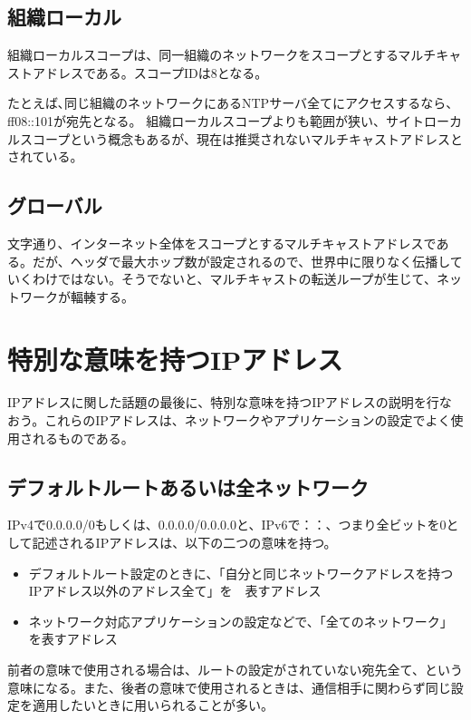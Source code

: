 \subsection{組織ローカル}
組織ローカルスコープは、同一組織のネットワークをスコープとするマルチキャストアドレスである。スコープIDは8となる。

たとえば､同じ組織のネットワークにあるNTPサーバ全てにアクセスするなら、ff08::101が宛先となる。
組織ローカルスコープよりも範囲が狭い、サイトローカルスコープという概念もあるが、現在は推奨されないマルチキャストアドレスとされている。

\subsection{グローバル}
文字通り、インターネット全体をスコープとするマルチキャストアドレスである。だが、ヘッダで最大ホップ数が設定されるので、世界中に限りなく伝播していくわけではない。そうでないと、マルチキャストの転送ループが生じて、ネットワークが輻輳する。


\section{特別な意味を持つIPアドレス}

IPアドレスに関した話題の最後に、特別な意味を持つIPアドレスの説明を行なおう。これらのIPアドレスは、ネットワークやアプリケーションの設定でよく使用されるものである。

\subsection{デフォルトルートあるいは全ネットワーク}

IPv4で0.0.0.0/0もしくは、0.0.0.0/0.0.0.0と、IPv6で：：、つまり全ビットを0として記述されるIPアドレスは、以下の二つの意味を持つ。

\begin{itemize}
\item デフォルトルート設定のときに、「自分と同じネットワークアドレスを持つIPアドレス以外のアドレス全て」を　表すアドレス
\item ネットワーク対応アプリケーションの設定などで、「全てのネットワーク」を表すアドレス
\end{itemize}

前者の意味で使用される場合は、ルートの設定がされていない宛先全て、という意味になる。また、後者の意味で使用されるときは、通信相手に関わらず同じ設定を適用したいときに用いられることが多い。

